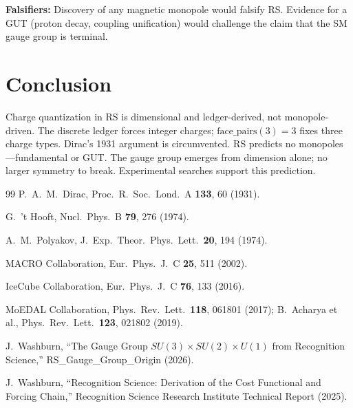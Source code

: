 \documentclass[12pt,a4paper]{article}
\theoremstyle{definition}
\theoremstyle{remark}
\begin{document}
\textbf{Falsifiers:} Discovery of any magnetic monopole would falsify
RS.  Evidence for a GUT (proton decay, coupling unification) would
challenge the claim that the SM gauge group is terminal.

\section{Conclusion}
\label{sec:conclusion}

Charge quantization in RS is dimensional and ledger-derived, not
monopole-driven.  The discrete ledger forces integer charges;
$\mathrm{face\_pairs}(3) = 3$ fixes three charge types.  Dirac's 1931
argument is circumvented.  RS predicts no monopoles---fundamental or
GUT.  The gauge group emerges from dimension alone; no larger symmetry
to break.  Experimental searches support this prediction.

\begin{thebibliography}{99}
P.~A.~M.~Dirac, Proc.\ R.\ Soc.\ Lond.\ A \textbf{133}, 60 (1931).

G.~'t Hooft, Nucl.\ Phys.\ B \textbf{79}, 276 (1974).

A.~M.~Polyakov, J.\ Exp.\ Theor.\ Phys.\ Lett.\ \textbf{20}, 194 (1974).

MACRO Collaboration, Eur.\ Phys.\ J.\ C \textbf{25}, 511 (2002).

IceCube Collaboration, Eur.\ Phys.\ J.\ C \textbf{76}, 133 (2016).

MoEDAL Collaboration, Phys.\ Rev.\ Lett.\ \textbf{118}, 061801 (2017);
  B.~Acharya et al., Phys.\ Rev.\ Lett.\ \textbf{123}, 021802 (2019).

J.~Washburn, ``The Gauge Group $SU(3) \times SU(2) \times U(1)$ from
  Recognition Science,'' RS\_Gauge\_Group\_Origin (2026).

J.~Washburn, ``Recognition Science: Derivation of the Cost
Functional and Forcing Chain,'' Recognition Science Research
Institute Technical Report (2025).
\end{thebibliography}
\end{document}
